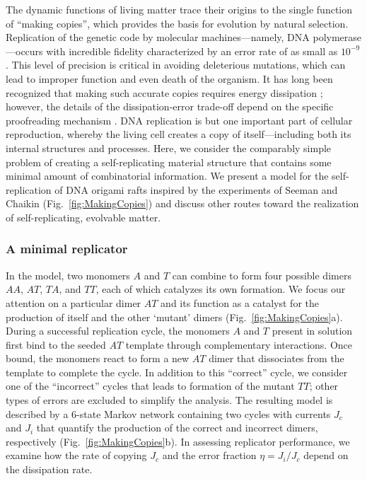 \begin{appendices}
The dynamic functions of living matter trace their origins to the single function of ``making copies'', which provides the basis for evolution by natural selection.  Replication of the genetic code by molecular machines---namely, DNA polymerase---occurs with incredible fidelity characterized by an error rate of as small as $10^{-9}$ \cite{McCulloch2008}. This level of precision is critical in avoiding deleterious mutations, which can lead to improper function and even death of the organism. It has long been recognized that making such accurate copies requires energy dissipation \cite{Bennett1979}; however, the details of the dissipation-error trade-off depend on the specific proofreading mechanism \cite{Sartori2013}. DNA replication is but one important part of cellular reproduction, whereby the living cell creates a copy of itself---including both its internal structures and processes.  Here, we consider the comparably simple problem of creating a self-replicating material structure that contains some minimal amount of combinatorial information. We present a model for the self-replication of DNA origami rafts inspired by the experiments of Seeman and Chaikin \cite{He2017} (Fig.~\ref{fig:MakingCopies}) and discuss other routes toward the realization of self-replicating, evolvable matter.

\subsubsection{A minimal replicator}

In the model, two monomers $A$ and $T$ can combine to form four possible dimers $AA$, $AT$, $TA$, and $TT$, each of which catalyzes its own formation.  We focus our attention on a particular dimer $AT$ and its function as a catalyst for the production of itself and the other `mutant' dimers (Fig.~\ref{fig:MakingCopies}a). During a successful replication cycle, the monomers $A$ and $T$ present in solution first bind to the seeded $AT$ template through complementary interactions.  Once bound, the monomers react to form a new $AT$ dimer that dissociates from the template to complete the cycle.  In addition to this ``correct'' cycle, we consider one of the ``incorrect'' cycles that leads to formation of the mutant $TT$; other types of errors are excluded to simplify the analysis.  The resulting model is described by a 6-state Markov network containing two cycles with currents $J_c$ and $J_i$ that quantify the production of the correct and incorrect dimers, respectively (Fig.~\ref{fig:MakingCopies}b).  In assessing replicator performance, we examine how the rate of copying $J_c$ and the error fraction $\eta = J_i/J_c$  depend on the dissipation rate. 


\end{appendices}
